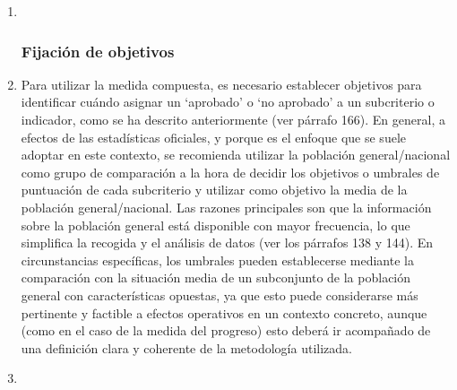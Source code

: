 \documentclass[
]{book}
\begin{document}
\begin{enumerate}
\def\labelenumi{\arabic{enumi}.}
\item ~
  \hypertarget{fijaciuxf3n-de-objetivos}{%
  \subsubsection{Fijación de objetivos}\label{fijaciuxf3n-de-objetivos}}
\item
  Para utilizar la medida compuesta, es necesario establecer objetivos para identificar cuándo asignar un `aprobado' o `no aprobado' a un subcriterio o indicador, como se ha descrito anteriormente (ver párrafo 166). En general, a efectos de las estadísticas oficiales, y porque es el enfoque que se suele adoptar en este contexto, se recomienda utilizar la población general/nacional como grupo de comparación a la hora de decidir los objetivos o umbrales de puntuación de cada subcriterio y utilizar como objetivo la media de la población general/nacional. Las razones principales son que la información sobre la población general está disponible con mayor frecuencia, lo que simplifica la recogida y el análisis de datos (ver los párrafos 138 y 144). En circunstancias específicas, los umbrales pueden establecerse mediante la comparación con la situación media de un subconjunto de la población general con características opuestas, ya que esto puede considerarse más pertinente y factible a efectos operativos en un contexto concreto, aunque (como en el caso de la medida del progreso) esto deberá ir acompañado de una definición clara y coherente de la metodología utilizada.
\item ~
  \hypertarget{resumen-de-recomendaciones-1}{%
}
\end{enumerate}
\end{document}
